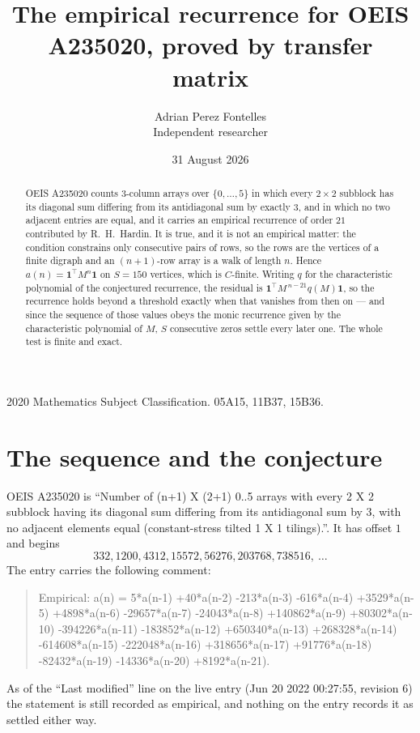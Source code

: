 \documentclass[11pt,a4paper]{article}
\title{The empirical recurrence for OEIS A235020, proved by transfer matrix}
\author{Adrian Perez Fontelles\\ \small Independent researcher}
\date{31 August 2026}
\theoremstyle{plain}
\theoremstyle{definition}
\begin{document}
\maketitle

\begin{abstract}
OEIS A235020 counts $3$-column arrays over $\{0,\dots,5\}$ in which every
$2\times2$ subblock has its diagonal sum differing from its antidiagonal sum by
exactly $3$, and in which no two adjacent entries are equal, and it
carries an empirical recurrence of order $21$ contributed by R.~H.~Hardin. It is true,
and it is not an empirical matter: the condition constrains only consecutive pairs of rows,
so the rows are the vertices of a finite digraph and an $(n+1)$-row array is a walk of
length $n$. Hence $a(n)=\mathbf{1}^{\!\top}M^{n}\mathbf{1}$ on $S=150$ vertices, which
is $C$-finite. Writing $q$ for the characteristic polynomial of the conjectured recurrence,
the residual is $\mathbf{1}^{\!\top}M^{\,n-21}q(M)\mathbf{1}$, so the recurrence
holds beyond a threshold exactly when that vanishes from then on --- and since the sequence
of those values obeys the monic recurrence given by the characteristic polynomial of $M$,
$S$ consecutive zeros settle every later one. The whole test is finite and exact.
\end{abstract}

\noindent\small 2020 Mathematics Subject Classification. 05A15, 11B37, 15B36.\normalsize

\section{The sequence and the conjecture}

OEIS A235020 is ``Number of (n+1) X (2+1) 0..5 arrays with every 2 X 2 subblock having its diagonal sum differing from its antidiagonal sum by 3, with no adjacent elements equal (constant-stress tilted 1 X 1 tilings).''. It has offset
$1$ and begins
\[
332, 1200, 4312, 15572, 56276, 203768, 738516,\ \dots
\]
The entry carries the following comment:
\begin{quote}\small
Empirical: a(n) = 5*a(n-1) +40*a(n-2) -213*a(n-3) -616*a(n-4) +3529*a(n-5) +4898*a(n-6) -29657*a(n-7) -24043*a(n-8) +140862*a(n-9) +80302*a(n-10) -394226*a(n-11) -183852*a(n-12) +650340*a(n-13) +268328*a(n-14) -614608*a(n-15) -222048*a(n-16) +318656*a(n-17) +91776*a(n-18) -82432*a(n-19) -14336*a(n-20) +8192*a(n-21).
\end{quote}
As of the ``Last modified'' line on the live entry (Jun 20 2022 00:27:55, revision 6) the statement is
still recorded as empirical, and nothing on the entry records it as settled either way.
\end{document}
